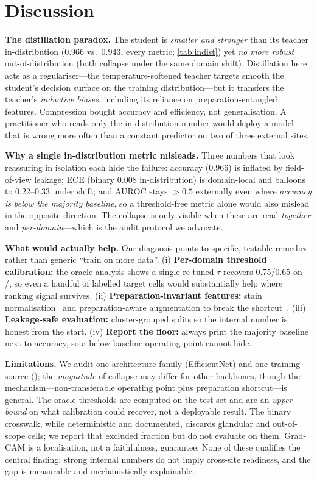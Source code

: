 \section{Discussion}
\label{sec:discussion}

\noindent\textbf{The distillation paradox.} The student is \emph{smaller and stronger} than its
teacher in-distribution ($0.966$ vs.\ $0.943$, every metric; \cref{tab:indist}) yet \emph{no more
robust} out-of-distribution (both collapse under the same domain shift). Distillation here acts as a
regulariser---the temperature-softened teacher targets smooth the student's decision surface on the
training distribution---but it transfers the teacher's \emph{inductive biases}, including its reliance
on preparation-entangled features. Compression bought accuracy and efficiency, not generalisation. A
practitioner who reads only the in-distribution number would deploy a model that is wrong more often
than a constant predictor on two of three external sites.

\noindent\textbf{Why a single in-distribution metric misleads.} Three numbers that look reassuring in
isolation each hide the failure: accuracy ($0.966$) is inflated by field-of-view leakage; ECE
(binary $0.008$ in-distribution) is domain-local and balloons to $0.22$--$0.33$ under shift; and AUROC
stays $>0.5$ externally even where
\emph{accuracy is below the majority baseline}, so a threshold-free metric alone would also mislead in
the opposite direction. The collapse is only visible when these are read \emph{together} and
\emph{per-domain}---which is the audit protocol we advocate.

\noindent\textbf{What would actually help.} Our diagnosis points to specific, testable remedies rather
than generic ``train on more data''. (i) \textbf{Per-domain threshold calibration:} the oracle analysis
shows a single re-tuned $\tau$ recovers $0.75$/$0.65$ on \herlev/\hicervix, so even a handful of
labelled target cells would substantially help where ranking signal survives. (ii)
\textbf{Preparation-invariant features:} stain normalisation~\cite{macenko2009stain} and
preparation-aware augmentation to break the shortcut~\cite{geirhos2020shortcut}. (iii)
\textbf{Leakage-safe evaluation:} cluster-grouped splits so the internal number is honest from the
start. (iv) \textbf{Report the floor:} always print the majority baseline next to accuracy, so a
below-baseline operating point cannot hide.

\noindent\textbf{Limitations.} We audit one architecture family (EfficientNet) and one training
source (\sipakmed); the \emph{magnitude} of collapse may differ for other backbones, though the
mechanism---non-transferable operating point plus preparation shortcut---is general. The oracle
thresholds are computed on the test set and are an \emph{upper bound} on what calibration could
recover, not a deployable result. The binary crosswalk, while deterministic and documented, discards
glandular and out-of-scope cells; we report that excluded fraction but do not evaluate on them. Grad-CAM
is a localisation, not a faithfulness, guarantee. None of these qualifies the central finding: strong
internal numbers do not imply cross-site readiness, and the gap is measurable and mechanistically
explainable.
